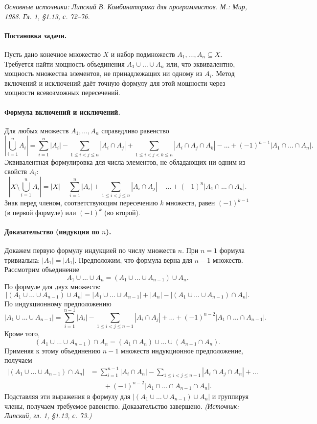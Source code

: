 \documentclass[a4paper,12pt]{article}
\begin{document}
\noindent\textit{Основные источники: Липский В. Комбинаторика для программистов. М.: Мир, 1988. Гл. 1, §1.13, с. 72--76.}

\paragraph{Постановка задачи.}
Пусть дано конечное множество \(X\) и набор подмножеств \(A_1,\dots,A_n\subseteq X\). Требуется найти мощность объединения \(A_1\cup\dots\cup A_n\) или, что эквивалентно, мощность множества элементов, не принадлежащих ни одному из \(A_i\). Метод включений и исключений даёт точную формулу для этой мощности через мощности всевозможных пересечений.

\paragraph{Формула включений и исключений.}
Для любых множеств \(A_1,\dots,A_n\) справедливо равенство
\[
\left|\bigcup_{i=1}^n A_i\right|
=
\sum_{i=1}^n |A_i|
-
\sum_{1\le i<j\le n} |A_i\cap A_j|
+
\sum_{1\le i<j<k\le n} |A_i\cap A_j\cap A_k|
-
\dots
+
(-1)^{n-1} |A_1\cap\dots\cap A_n|.
\]
Эквивалентная формулировка для числа элементов, не обладающих ни одним из свойств \(A_i\):
\[
\left|X \setminus \bigcup_{i=1}^n A_i\right|
=
|X|
-
\sum_{i=1}^n |A_i|
+
\sum_{1\le i<j\le n} |A_i\cap A_j|
-
\dots
+
(-1)^n |A_1\cap\dots\cap A_n|.
\]
Знак перед членом, соответствующим пересечению \(k\) множеств, равен \((-1)^{k-1}\) (в первой формуле) или \((-1)^k\) (во второй).

\paragraph{Доказательство (индукция по \(n\)).}
Докажем первую формулу индукцией по числу множеств \(n\). При \(n=1\) формула тривиальна: \(|A_1|=|A_1|\). Предположим, что формула верна для \(n-1\) множеств. Рассмотрим объединение
\[
A_1\cup\dots\cup A_n = (A_1\cup\dots\cup A_{n-1}) \cup A_n.
\]
По формуле для двух множеств:
\[
|(A_1\cup\dots\cup A_{n-1}) \cup A_n|
=
|A_1\cup\dots\cup A_{n-1}| + |A_n| - |(A_1\cup\dots\cup A_{n-1}) \cap A_n|.
\]
По индукционному предположению
\[
|A_1\cup\dots\cup A_{n-1}|
=
\sum_{i=1}^{n-1}|A_i|
-
\sum_{1\le i<j\le n-1}|A_i\cap A_j|
+
\dots
+
(-1)^{n-2}|A_1\cap\dots\cap A_{n-1}|.
\]
Кроме того,
\[
(A_1\cup\dots\cup A_{n-1}) \cap A_n
=
(A_1\cap A_n) \cup \dots \cup (A_{n-1}\cap A_n).
\]
Применяя к этому объединению \(n-1\) множеств индукционное предположение, получаем
\[
\begin{aligned}
|(A_1\cup\dots\cup A_{n-1}) \cap A_n|
&=
\sum_{i=1}^{n-1}|A_i\cap A_n|
-
\sum_{1\le i<j\le n-1}|A_i\cap A_j\cap A_n|
+
\dots \\
&\qquad
+
(-1)^{n-2}|A_1\cap\dots\cap A_{n-1}\cap A_n|.
\end{aligned}
\]
Подставляя эти выражения в формулу для \(|(A_1\cup\dots\cup A_{n-1})\cup A_n|\) и группируя члены, получаем требуемое равенство. Доказательство завершено.
\textit{(Источник: Липский, гл. 1, §1.13, с. 73.)}
\end{document}

